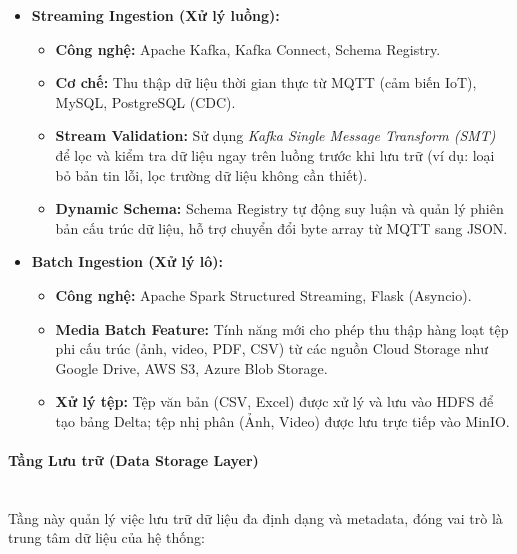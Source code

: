 \begin{itemize}
    \item \textbf{Streaming Ingestion (Xử lý luồng):}
    \begin{itemize}
        \item \textbf{Công nghệ:} Apache Kafka, Kafka Connect, Schema Registry.
        \item \textbf{Cơ chế:} Thu thập dữ liệu thời gian thực từ MQTT (cảm biến IoT), MySQL, PostgreSQL (CDC).
        \item \textbf{Stream Validation:} Sử dụng \textit{Kafka Single Message Transform (SMT)} để lọc và kiểm tra dữ liệu ngay trên luồng trước khi lưu trữ (ví dụ: loại bỏ bản tin lỗi, lọc trường dữ liệu không cần thiết).
        \item \textbf{Dynamic Schema:} Schema Registry tự động suy luận và quản lý phiên bản cấu trúc dữ liệu, hỗ trợ chuyển đổi byte array từ MQTT sang JSON.
    \end{itemize}
    
    \item \textbf{Batch Ingestion (Xử lý lô):}
    \begin{itemize}
        \item \textbf{Công nghệ:} Apache Spark Structured Streaming, Flask (Asyncio).
        \item \textbf{Media Batch Feature:} Tính năng mới cho phép thu thập hàng loạt tệp phi cấu trúc (ảnh, video, PDF, CSV) từ các nguồn Cloud Storage như Google Drive, AWS S3, Azure Blob Storage.
        \item \textbf{Xử lý tệp:} Tệp văn bản (CSV, Excel) được xử lý và lưu vào HDFS để tạo bảng Delta; tệp nhị phân (Ảnh, Video) được lưu trực tiếp vào MinIO.
    \end{itemize}
\end{itemize}

\paragraph{Tầng Lưu trữ (Data Storage Layer)}
\mbox{}\\
Tầng này quản lý việc lưu trữ dữ liệu đa định dạng và metadata, đóng vai trò là trung tâm dữ liệu của hệ thống:

